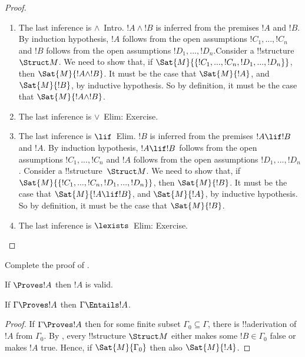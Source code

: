 \documentclass[../../include/open-logic-section]{subfiles}
\begin{document}
\begin{proof}
\begin{enumerate}
\item The last inference is $\land$~Intro. $!A \land !B$ is inferred from
the premises $!A$
and $!B$. By induction hypothesis, $!A$ follows from the open assumptions
$!C_1,...,!C_n$ and $!B$ follows from the open assumptions
$!D_1,...,!D_n$.Consider a !!{structure}~$\Struct M$. We need to show that, 
if $\Sat{M}{\{!C_1,...,!C_n,!D_1,...,!D_n\}}$, then $\Sat{M}{!A \land !B}$.
It must be the case that $\Sat{M}{!A}$, and $\Sat{M}{!B}$, by inductive
hypothesis.
So by definition, it must be the case that $\Sat{M}{!A \land !B}$.
  
\item The last inference is $\lor$~Elim: Exercise.

\item The last inference is $\lif$~Elim. $!B$ is inferred from the
premises $!A \lif !B$ and $!A$. By induction hypothesis, $!A \lif !B$ 
follows from the open assumptions $!C_1,...,!C_n$
and $!A$ follows from the open assumptions $!D_1,...,!D_n$. Consider a
!!{structure}~$\Struct M$. We need to show that, if
$\Sat{M}{\{!C_1,...,!C_n,!D_1,...,!D_n\}}$, then $\Sat{M}{!B}$.
It must be the case that $\Sat{M}{!A \lif !B}$, and $\Sat{M}{!A}$, by
inductive hypothesis.
So by definition, it must be the case that $\Sat{M}{!B}$.
    
\item The last inference is $\lexists$~Elim: Exercise.
\end{enumerate}
\end{proof}

\begin{prob}
Complete the proof of .
\end{prob}

\begin{cor}
If $\Proves !A$ then $!A$ is valid.
\end{cor}

\begin{cor}
If $\Gamma \Proves !A$ then $\Gamma \Entails !A$.
\end{cor}

\begin{proof}
If $\Gamma \Proves !A$ then for some finite subset $\Gamma_0 \subseteq
\Gamma$, there is !!a{derivation} of $!A$ from $\Gamma_0$.  By
, every !!{structure} $\Struct M$ either
makes some $!B \in \Gamma_0$ false or makes $!A$ true.  Hence, if
$\Sat{M}{\Gamma_0}$ then also $\Sat{M}{!A}$.
\end{proof}
\end{document}
